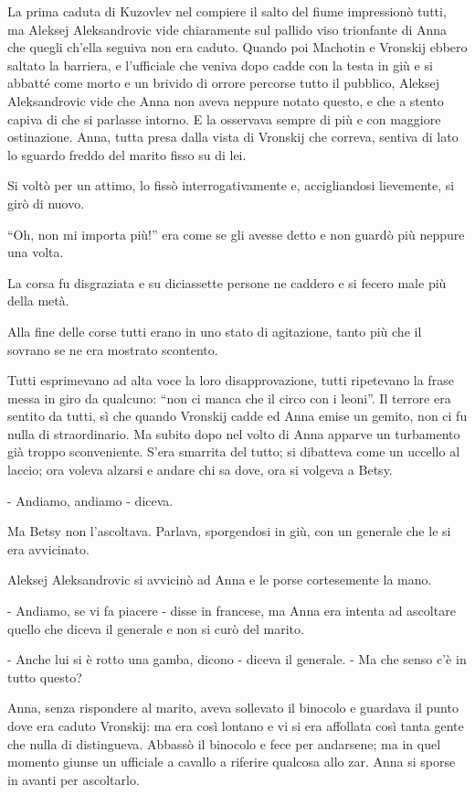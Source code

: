 La prima caduta di Kuzovlev nel compiere il salto del fiume impressionò tutti, ma Aleksej Aleksandrovic vide chiaramente sul pallido viso trionfante di Anna che quegli ch'ella seguiva non era caduto. Quando poi Machotin e Vronskij ebbero saltato la barriera, e l'ufficiale che veniva dopo cadde con la testa in giù e si abbatté come morto e un brivido di orrore percorse tutto il pubblico, Aleksej Aleksandrovic vide che Anna non aveva neppure notato questo, e che a stento capiva di che si parlasse intorno. E la osservava sempre di più e con maggiore ostinazione. Anna, tutta presa dalla vista di Vronskij che correva, sentiva di lato lo sguardo freddo del marito fisso su di lei. 

Si voltò per un attimo, lo fissò interrogativamente e, accigliandosi lievemente, si girò di nuovo. 

``Oh, non mi importa più!'' era come se gli avesse detto e non guardò più neppure una volta. 

La corsa fu disgraziata e su diciassette persone ne caddero e si fecero male più della metà. 

Alla fine delle corse tutti erano in uno stato di agitazione, tanto più che il sovrano se ne era mostrato scontento. 

Tutti esprimevano ad alta voce la loro disapprovazione, tutti ripetevano la frase messa in giro da qualcuno: ``non ci manca che il circo con i leoni''. Il terrore era sentito da tutti, sì che quando Vronskij cadde ed Anna emise un gemito, non ci fu nulla di straordinario. Ma subito dopo nel volto di Anna apparve un turbamento già troppo sconveniente. S'era smarrita del tutto; si dibatteva come un uccello al laccio; ora voleva alzarsi e andare chi sa dove, ora si volgeva a Betsy. 

- Andiamo, andiamo - diceva. 

Ma Betsy non l'ascoltava. Parlava, sporgendosi in giù, con un generale che le si era avvicinato. 

Aleksej Aleksandrovic si avvicinò ad Anna e le porse cortesemente la mano. 

- Andiamo, se vi fa piacere - disse in francese, ma Anna era intenta ad ascoltare quello che diceva il generale e non si curò del marito. 

- Anche lui si è rotto una gamba, dicono - diceva il generale. - Ma che senso c'è in tutto questo? 

Anna, senza rispondere al marito, aveva sollevato il binocolo e guardava il punto dove era caduto Vronskij: ma era così lontano e vi si era affollata così tanta gente che nulla di distingueva. Abbassò il binocolo e fece per andarsene; ma in quel momento giunse un ufficiale a cavallo a riferire qualcosa allo zar. Anna si sporse in avanti per ascoltarlo. 

